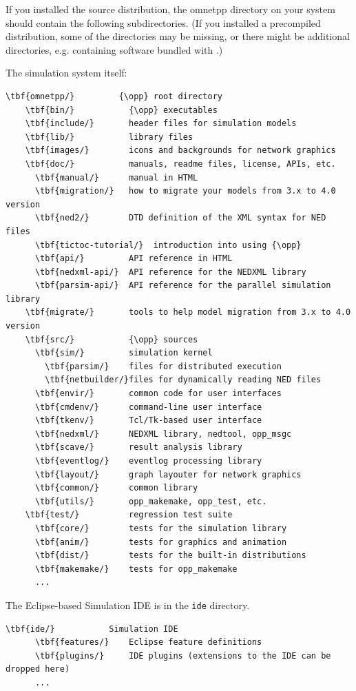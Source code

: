 If you installed the source distribution, the omnetpp directory on your system
should contain the following subdirectories. (If you installed a precompiled
distribution, some of the directories may be missing, or there might be
additional directories, e.g. containing software bundled with {\opp}.)

The simulation system itself:

\begin{Verbatim}[commandchars=\\\{\}]
  \tbf{omnetpp/}         {\opp} root directory
    \tbf{bin/}           {\opp} executables
    \tbf{include/}       header files for simulation models
    \tbf{lib/}           library files
    \tbf{images/}        icons and backgrounds for network graphics
    \tbf{doc/}           manuals, readme files, license, APIs, etc.
      \tbf{manual/}      manual in HTML
      \tbf{migration/}   how to migrate your models from 3.x to 4.0 version
      \tbf{ned2/}        DTD definition of the XML syntax for NED files
      \tbf{tictoc-tutorial/}  introduction into using {\opp}
      \tbf{api/}         API reference in HTML
      \tbf{nedxml-api/}  API reference for the NEDXML library
      \tbf{parsim-api/}  API reference for the parallel simulation library
    \tbf{migrate/}       tools to help model migration from 3.x to 4.0 version
    \tbf{src/}           {\opp} sources
      \tbf{sim/}         simulation kernel
        \tbf{parsim/}    files for distributed execution
        \tbf{netbuilder/}files for dynamically reading NED files
      \tbf{envir/}       common code for user interfaces
      \tbf{cmdenv/}      command-line user interface
      \tbf{tkenv/}       Tcl/Tk-based user interface
      \tbf{nedxml/}      NEDXML library, nedtool, opp_msgc
      \tbf{scave/}       result analysis library
      \tbf{eventlog/}    eventlog processing library
      \tbf{layout/}      graph layouter for network graphics
      \tbf{common/}      common library
      \tbf{utils/}       opp_makemake, opp_test, etc.
    \tbf{test/}          regression test suite
      \tbf{core/}        tests for the simulation library
      \tbf{anim/}        tests for graphics and animation
      \tbf{dist/}        tests for the built-in distributions
      \tbf{makemake/}    tests for opp_makemake
      ...
\end{Verbatim}

The Eclipse-based Simulation IDE is in the \texttt{ide} directory.

\begin{Verbatim}[commandchars=\\\{\}]
    \tbf{ide/}           Simulation IDE
      \tbf{features/}    Eclipse feature definitions
      \tbf{plugins/}     IDE plugins (extensions to the IDE can be dropped here)
      ...
\end{Verbatim}

